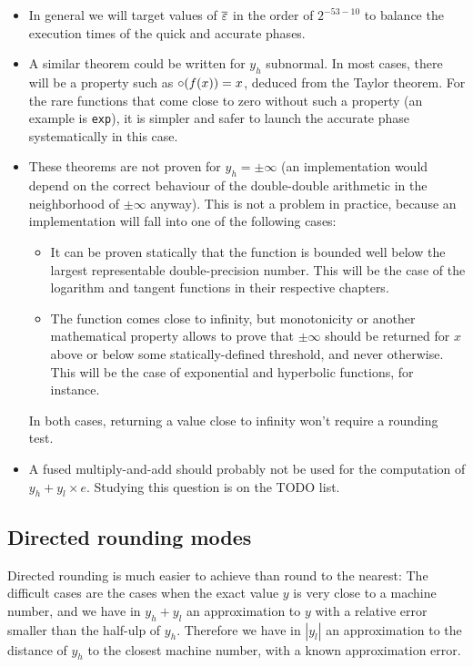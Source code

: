 \begin{itemize}
\item In general we will target values of ${\overline{\varepsilon}}$ in the order of
  $2^{-53-10}$ to balance the execution times of the quick and
  accurate phases.

\item A similar theorem could be written for $y_h$ subnormal. In most
  cases, there will be a property such as $\circ(f(x))=x$, deduced
  from the Taylor theorem. For the rare functions that come close to
  zero without such a property (an example is \texttt{exp}), it is
  simpler and safer to launch the accurate phase systematically in
  this case.

\item These theorems are not proven for $y_h = \pm \infty$ (an
  implementation would depend on the correct behaviour of the
  double-double arithmetic in the neighborhood of $\pm \infty$
  anyway).  This is not a problem in practice, because an
  implementation will fall into one of the following cases:
\begin{itemize}
\item It can be proven statically that the function is bounded well
  below the largest representable double-precision number. This will
  be the case of the logarithm and tangent functions in their
  respective chapters.
\item The function comes close to infinity, but monotonicity or
  another mathematical property allows to prove that $\pm \infty$
  should be returned for $x$ above or below some statically-defined
  threshold, and never otherwise. This will be the case of exponential
  and hyperbolic functions, for instance.
\end{itemize}
In both cases, returning a value close to infinity won't require a
rounding test.


\item A fused multiply-and-add should probably not be used for the
  computation of $y_h+y_l\times e$. Studying this question is on the
  TODO list.

\end{itemize}



\subsection{Directed rounding modes}

Directed rounding is much easier to achieve than round to the nearest:
The difficult cases are the cases when the exact value $y$ is very
close to a machine number, and we have in $y_h+y_l$ an approximation to
$y$ with a relative error smaller than the half-ulp of $y_h$.
Therefore we have in $|y_l|$ an approximation to the distance of
$y_h$ to the closest machine number, with a known approximation error.



